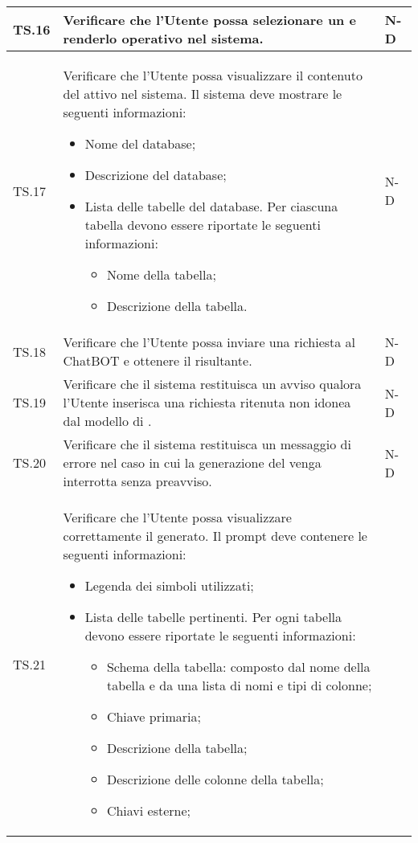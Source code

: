 \begin{adjustwidth}{-0.5cm}{-0.5cm}
\begin{longtable}{|P{1.5cm}|>{\raggedright}P{9.5cm}|>{\arraybackslash}P{1.5cm}|}
		\hline TS.16 & Verificare che l'Utente possa selezionare un  e renderlo operativo nel sistema. & N-D \\ 
		\hline TS.17 & Verificare che l'Utente possa visualizzare il contenuto del  attivo nel sistema. Il sistema deve mostrare le seguenti informazioni:
		\begin{itemize}
			\item Nome del database;
			\item Descrizione del database;
			\item Lista delle tabelle del database. Per ciascuna tabella devono essere riportate le seguenti informazioni:
				\begin{itemize}
					\item Nome della tabella;
					\item Descrizione della tabella.
				\end{itemize}
		\end{itemize} & N-D \\  
		\hline TS.18 & Verificare che l'Utente possa inviare una richiesta al ChatBOT e ottenere il  risultante. & N-D \\ 
		\hline TS.19 & Verificare che il sistema restituisca un avviso qualora l'Utente inserisca una richiesta ritenuta non idonea dal modello di . & N-D \\
		\hline TS.20 & Verificare che il sistema restituisca un messaggio di errore nel caso in cui la generazione del  venga interrotta senza preavviso. & N-D \\ 
		\hline TS.21 & Verificare che l'Utente possa visualizzare correttamente il  generato. Il prompt deve contenere le seguenti informazioni:
		\begin{itemize}
			\item Legenda dei simboli utilizzati;
			\item Lista delle tabelle pertinenti. Per ogni tabella devono essere riportate le seguenti informazioni:
			\begin{itemize}
				\item Schema della tabella: composto dal nome della tabella e da una lista di nomi e tipi di colonne;
				\item Chiave primaria;
				\item Descrizione della tabella;
				\item Descrizione delle colonne della tabella;
				\item Chiavi esterne;

\end{itemize}
\end{itemize}
\end{longtable}
\end{adjustwidth}
